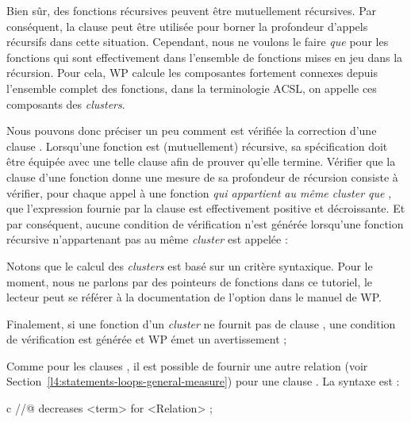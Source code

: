 

Bien sûr, des fonctions récursives peuvent être mutuellement récursives. Par
conséquent, la clause  peut être utilisée pour borner la
profondeur d'appels récursifs dans cette situation. Cependant, nous ne voulons
le faire \textit{que} pour les fonctions qui sont effectivement dans l'ensemble de
fonctions mises en jeu dans la récursion. Pour cela, WP calcule les composantes
fortement connexes depuis l'ensemble complet des fonctions, dans la terminologie
ACSL, on appelle ces composants des \textit{clusters}.


Nous pouvons donc préciser un peu comment est vérifiée la correction d'une clause
. Lorsqu'une fonction est (mutuellement) récursive, sa
spécification doit être équipée avec une telle clause afin de prouver qu'elle
termine. Vérifier que la clause  d'une fonction
 donne une mesure de sa profondeur de récursion consiste à vérifier,
pour chaque appel à une fonction \textit{qui appartient au même cluster que
}, que l'expression fournie par la clause est effectivement positive
et décroissante. Et par conséquent, aucune condition de vérification n'est
générée lorsqu'une fonction récursive n'appartenant pas au même \textit{cluster}
est appelée :




\begin{Information}
  Notons que le calcul des \textit{clusters} est basé sur un critère syntaxique.
  Pour le moment, nous ne parlons par des pointeurs de fonctions dans ce tutoriel,
  le lecteur peut se référer à la documentation de l'option
   dans le manuel de WP.
\end{Information}


Finalement, si une fonction d'un \textit{cluster} ne fournit pas de clause
, une condition de vérification
 est générée et WP émet un avertissement ;






\begin{Information}
  Comme pour les clauses , il est possible de fournir
  une autre relation (voir Section~\ref{l4:statements-loops-general-measure})
  pour une clause . La syntaxe est :


  \begin{CodeBlock}{c}
//@ decreases <term> for <Relation> ;
\end{CodeBlock}
\end{Information}


